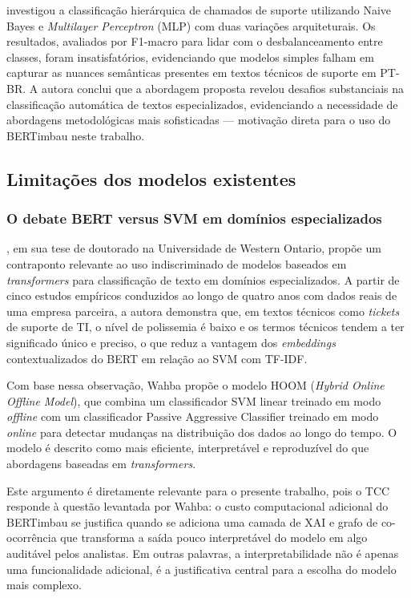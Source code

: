 \documentclass[
    12pt,                %
    openright,           %
    oneside,             %
    a4paper,             %
    english,             %
    brazil               %
]{abntex2}
\begin{document}
 investigou a classificação hierárquica de chamados de suporte utilizando Naive Bayes e \textit{Multilayer Perceptron} (MLP) com duas variações arquiteturais. Os resultados, avaliados por F1-macro para lidar com o desbalanceamento entre classes, foram insatisfatórios, evidenciando que modelos simples falham em capturar as nuances semânticas presentes em textos técnicos de suporte em PT-BR. A autora conclui que a abordagem proposta revelou desafios substanciais na classificação automática de textos especializados, evidenciando a necessidade de abordagens metodológicas mais sofisticadas — motivação direta para o uso do BERTimbau neste trabalho.

\subsection{Limitações dos modelos existentes}
\label{subsec:helpdesk_limitacoes}

\subsubsection{O debate BERT versus SVM em domínios especializados}
\label{subsubsec:helpdesk_debate}

, em sua tese de doutorado na Universidade de Western Ontario, propõe um contraponto relevante ao uso indiscriminado de modelos baseados em \textit{transformers} para classificação de texto em domínios especializados. A partir de cinco estudos empíricos conduzidos ao longo de quatro anos com dados reais de uma empresa parceira, a autora demonstra que, em textos técnicos como \textit{tickets} de suporte de TI, o nível de polissemia é baixo e os termos técnicos tendem a ter significado único e preciso, o que reduz a vantagem dos \textit{embeddings} contextualizados do BERT em relação ao SVM com TF-IDF.

Com base nessa observação, Wahba propõe o modelo HOOM (\textit{Hybrid Online Offline Model}), que combina um classificador SVM linear treinado em modo \textit{offline} com um classificador Passive Aggressive Classifier treinado em modo \textit{online} para detectar mudanças na distribuição dos dados ao longo do tempo. O modelo é descrito como mais eficiente, interpretável e reproduzível do que abordagens baseadas em \textit{transformers}.

Este argumento é diretamente relevante para o presente trabalho, pois o TCC responde à questão levantada por Wahba: o custo computacional adicional do BERTimbau se justifica quando se adiciona uma camada de XAI e grafo de co-ocorrência que transforma a saída pouco interpretável do modelo em algo auditável pelos analistas. Em outras palavras, a interpretabilidade não é apenas uma funcionalidade adicional, é a justificativa central para a escolha do modelo mais complexo.
\end{document}
